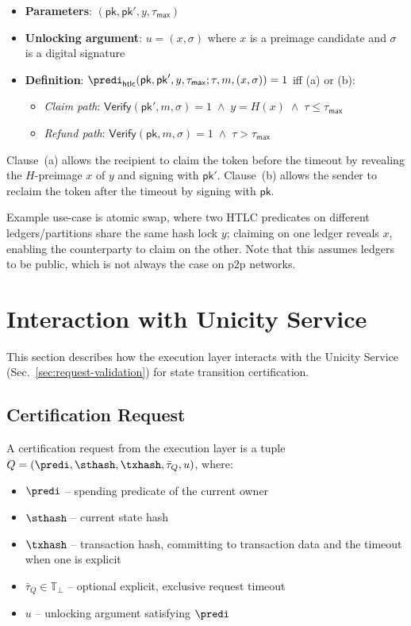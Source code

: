 \begin{itemize}
	\item \textbf{Parameters}: $(\mathsf{pk}, \mathsf{pk}', y, \tau_\mathsf{max})$
	\item \textbf{Unlocking argument}: $u = (x, \sigma)$ where $x$ is a preimage candidate and $\sigma$ is a digital signature
	\item \textbf{Definition}: $\predi_\mathsf{htlc}(\mathsf{pk}, \mathsf{pk}', y, \tau_\mathsf{max}; \tau, m, (x, \sigma)) = 1$ iff (a) or (b):
	\begin{itemize}
		\item[(a)] \emph{Claim path}: $\mathsf{Verify}(\mathsf{pk}', m, \sigma) = 1 \;\land\; y = H(x) \;\land\; \tau \le \tau_\mathsf{max}$
		\item[(b)] \emph{Refund path}: $\mathsf{Verify}(\mathsf{pk}, m, \sigma) = 1 \;\land\; \tau > \tau_\mathsf{max}$
	\end{itemize}
\end{itemize}

Clause~(a) allows the recipient to claim the token before the timeout by revealing the $H$-preimage $x$ of $y$ and signing with $\mathsf{pk}'$. Clause~(b) allows the sender to reclaim the token after the timeout by signing with $\mathsf{pk}$.

Example use-case is atomic swap, where two HTLC predicates on different ledgers/partitions share the same hash lock $y$; claiming on one ledger reveals $x$, enabling the counterparty to claim on the other. Note that this assumes ledgers to be public, which is not always the case on p2p networks.


\section{Interaction with Unicity Service}\label{sec:el-us-interaction}

This section describes how the execution layer interacts with the Unicity Service (Sec.~\ref{sec:request-validation}) for state transition certification.

\subsection{Certification Request}

A certification request from the execution layer is a tuple $Q = (\predi, \sthash, \txhash, \bar\tau_Q, u)$, where:
\begin{itemize}
	\item $\predi$ -- spending predicate of the current owner
	\item $\sthash$ -- current state hash
	\item $\txhash$ -- transaction hash, committing to transaction data and the timeout when one is explicit
	\item $\bar\tau_Q\in\mathbb{T}_\bot$ -- optional explicit, exclusive request timeout
	\item $u$ -- unlocking argument satisfying $\predi$
\end{itemize}

